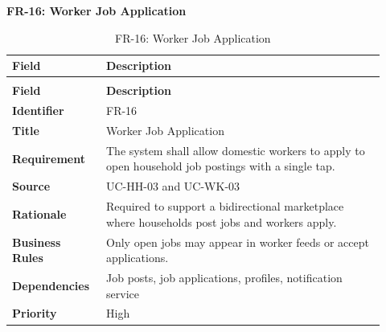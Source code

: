 \documentclass[12pt,a4paper]{article}
\begin{document}
\noindent\textbf{FR-16: Worker Job Application}\par
\vspace{4pt}
\begingroup\small\setlength{\tabcolsep}{4pt}\renewcommand{\arraystretch}{1.15}
\begin{longtable}{|>{\raggedright\arraybackslash}p{0.22\linewidth}|>{\raggedright\arraybackslash}p{0.70\linewidth}|}
\caption{FR-16: Worker Job Application}\label{tab:fr-16}\\
\hline
\textbf{Field} & \textbf{Description} \\ \hline
\endfirsthead
\multicolumn{2}{c}{Table \thetable\ Worker Job Application (continued)}\\
\hline
\textbf{Field} & \textbf{Description} \\ \hline
\endhead
\textbf{Identifier} & FR-16 \\ \hline
\textbf{Title} & Worker Job Application \\ \hline
\textbf{Requirement} & The system shall allow domestic workers to apply to open household job postings with a single tap. \\ \hline
\textbf{Source} & UC-HH-03 and UC-WK-03 \\ \hline
\textbf{Rationale} & Required to support a bidirectional marketplace where households post jobs and workers apply. \\ \hline
\textbf{Business Rules} & Only open jobs may appear in worker feeds or accept applications. \\ \hline
\textbf{Dependencies} & Job posts, job applications, profiles, notification service \\ \hline
\textbf{Priority} & High \\ \hline
\end{longtable}
\endgroup
\clearpage
\end{document}

